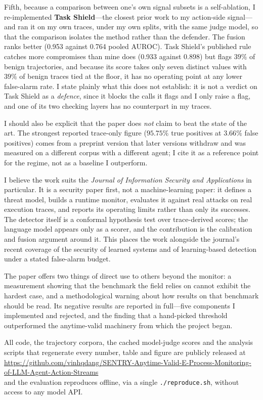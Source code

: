 \documentclass[10pt]{article}
\begin{document}
Fifth, because a comparison between one's own signal subsets is a self-ablation, I
re-implemented \textbf{Task Shield}---the closest prior work to my action-side
signal---and ran it on my own traces, under my own splits, with the same judge
model, so that the comparison isolates the method rather than the defender. The
fusion ranks better (0.953 against 0.764 pooled AUROC). Task Shield's published
rule catches more compromises than mine does (0.933 against 0.898) but flags $39\%$
of benign trajectories, and because its score takes only seven distinct values with
$39\%$ of benign traces tied at the floor, it has no operating point at any lower
false-alarm rate. I state plainly what this does not establish: it is not a verdict
on Task Shield as a \emph{defence}, since it blocks the calls it flags and I only
raise a flag, and one of its two checking layers has no counterpart in my traces.

I should also be explicit that the paper does \emph{not} claim to beat the state of
the art. The strongest reported trace-only figure ($95.75\%$ true positives at
$3.66\%$ false positives) comes from a preprint version that later versions
withdraw and was measured on a different corpus with a different agent; I cite it
as a reference point for the regime, not as a baseline I outperform.

I believe the work suits the \emph{Journal of Information Security and
Applications} in particular. It is a security paper first, not a machine-learning
paper: it defines a threat model, builds a runtime monitor, evaluates it against
real attacks on real execution traces, and reports its operating limits rather than
only its successes. The detector itself is a conformal hypothesis test over
trace-derived scores; the language model appears only as a scorer, and the
contribution is the calibration and fusion argument around it. This places the work
alongside the journal's recent coverage of the security of learned systems and of
learning-based detection under a stated false-alarm budget.

The paper offers two things of direct use to others beyond the monitor: a
measurement showing that the benchmark the field relies on cannot exhibit the
hardest case, and a methodological warning about how results on that benchmark
should be read. Its negative results are reported in full---five components I
implemented and rejected, and the finding that a hand-picked threshold outperformed
the anytime-valid machinery from which the project began.

All code, the trajectory corpora, the cached model-judge scores and the analysis
scripts that regenerate every number, table and figure are publicly released at\\
\url{https://github.com/vinhqdang/SENTRY-Anytime-Valid-E-Process-Monitoring-of-LLM-Agent-Action-Streams}\\
and the evaluation reproduces offline, via a single \texttt{./reproduce.sh}, without
access to any model API.
\end{document}

